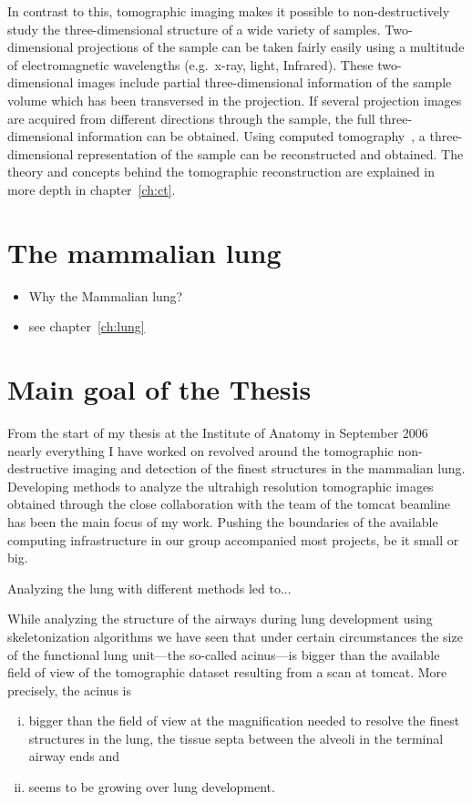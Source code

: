 In contrast to this, tomographic imaging makes it possible to non-destructively study the three-dimensional structure of a wide variety of samples. Two-dimensional projections of the sample can be taken fairly easily using a multitude of electromagnetic wavelengths (e.g.\ x-ray, light, Infrared). These two-dimensional images include partial three-dimensional information of the sample volume which has been transversed in the projection. If several projection images are acquired from different directions through the sample, the full three-dimensional information can be obtained. Using computed tomography~\cite{Hounsfield1976a}, a three-dimensional representation of the sample can be reconstructed and obtained. The theory and concepts behind the tomographic reconstruction are explained in more depth in chapter~\ref{ch:ct}.

\section{The mammalian lung}
\begin{itemize}
	\item Why the Mammalian lung?
	\item see chapter~\ref{ch:lung}
\end{itemize}

\section{Main goal of the Thesis}
From the start of my thesis at the Institute of Anatomy in September 2006 nearly everything I have worked on revolved around the tomographic non-destructive imaging and detection of the finest structures in the mammalian lung. Developing methods to analyze the ultrahigh resolution tomographic images obtained through the close collaboration with the team of the \ac{tomcat} beamline has been the main focus of my work. Pushing the boundaries of the available computing infrastructure in our group accompanied most projects, be it small or big.

Analyzing the lung with different methods led to...

While analyzing the structure of the airways during lung development using skeletonization algorithms we have seen that under certain circumstances the size of the functional lung unit---the so-called acinus---is bigger than the available field of view of the tomographic dataset resulting from a scan at \ac{tomcat}. More precisely, the acinus is 
\begin{enumerate}[i)]
	\item bigger than the field of view at the magnification needed to resolve the finest structures in the lung, the tissue septa between the alveoli in the terminal airway ends and
	\item seems to be growing over lung development.
\end{enumerate}

